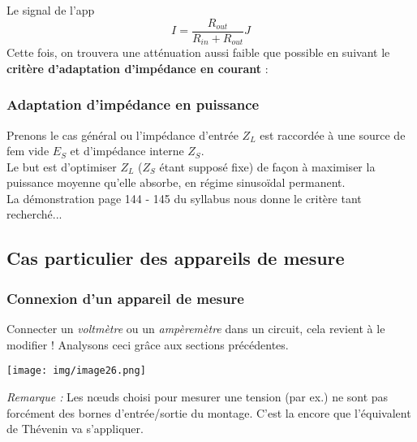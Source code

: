 Le signal de l'app
\begin{equation}
I = \frac{R_{out}}{R_{in} + R_{out}}J
\end{equation}
Cette fois, on trouvera une atténuation aussi faible que possible en suivant le \textbf{critère d'adaptation d'impédance en courant} :\\


\subsubsection{Adaptation d'impédance en puissance}
Prenons le cas général ou l'impédance d'entrée $Z_L$ est raccordée à une source de fem vide \underline{$E_S$} et d'impédance interne $Z_S$.\\
Le but est d'optimiser $Z_L$ ($Z_S$ étant supposé fixe) de façon à maximiser la puissance moyenne qu'elle absorbe, en régime sinusoïdal permanent.\\
La démonstration page 144 - 145 du syllabus nous donne le critère tant recherché...\\



\subsection{Cas particulier des appareils de mesure}
\subsubsection{Connexion d'un appareil de mesure}
Connecter un \textit{voltmètre} ou un \textit{ampèremètre} dans un circuit, cela revient à le modifier ! Analysons ceci grâce aux sections précédentes.\\
\begin{center}
\texttt{[image: img/image26.png]}
\end{center}
\textit{Remarque :} Les nœuds choisi pour mesurer une tension (par ex.) ne sont pas forcément des bornes d'entrée/sortie du montage. C'est la encore que l'équivalent de Thévenin va s'appliquer.

